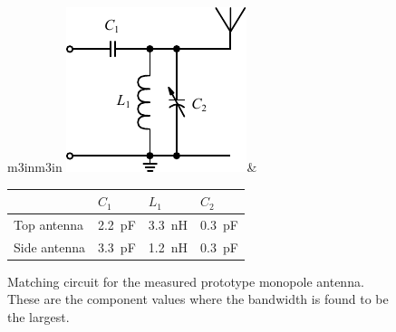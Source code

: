 \begin{figure}[htbp]
        \centering
        \begin{tabular}{m{3in}m{3in}}
            \centering
            \includegraphics{img/tech_sol/schematic_tuning_1}&
            \centering
            \footnotesize
            \begin{tabular}{|l|l|l|l|}
                \hline
                & $C_1$ & $L_1$ & $C_2$ \\
                \hline
                Top antenna & \SI{2.2}{pF} & \SI{3.3}{nH} & \SI{0.3}{pF} \\
                Side antenna & \SI{3.3}{pF} & \SI{1.2}{nH} & \SI{0.3}{pF} \\
                \hline
            \end{tabular}
        \end{tabular}
    \caption{Matching circuit for the measured prototype monopole antenna. These are the component values where the bandwidth is found to be the largest.}
    \label{fig:mono_proto_meas_matching}
\end{figure}

